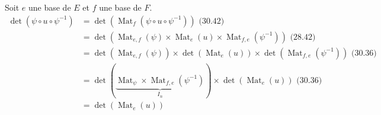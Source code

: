 \documentclass[../main.tex]{subfiles}
\begin{document}
\noindent Soit $e$ une base de $E$ et $f$ une base de $F$. 
\begin{align*}
    \operatorname{det}(\psi\circ u\circ \psi^{-1}) &= \operatorname{det}(\operatorname{Mat}_f(\psi\circ u\circ \psi^{-1})) \text{ (30.42)} \\
    &= \operatorname{det}(\operatorname{Mat}_{e,f}(\psi)\times \operatorname{Mat}_e(u)\times \operatorname{Mat}_{f,e}(\psi^{-1})) \text{ (28.42)} \\
    &= \operatorname{det}(\operatorname{Mat}_{e,f}(\psi)) \times \operatorname{det}(\operatorname{Mat}_e(u)) \times \operatorname{det}(\operatorname{Mat}_{f,e}(\psi^{-1})) \text{ (30.36)} \\
    &= \operatorname{det}(\underbrace{\operatorname{Mat}_{\psi}\times \operatorname{Mat}_{f, e}(\psi^{-1})}_{I_n}) \times \operatorname{det}(\operatorname{Mat}_e(u)) \text{ (30.36)} \\
    &= \operatorname{det}(\operatorname{Mat}_e(u)) \\
\end{align*}
\end{document}
